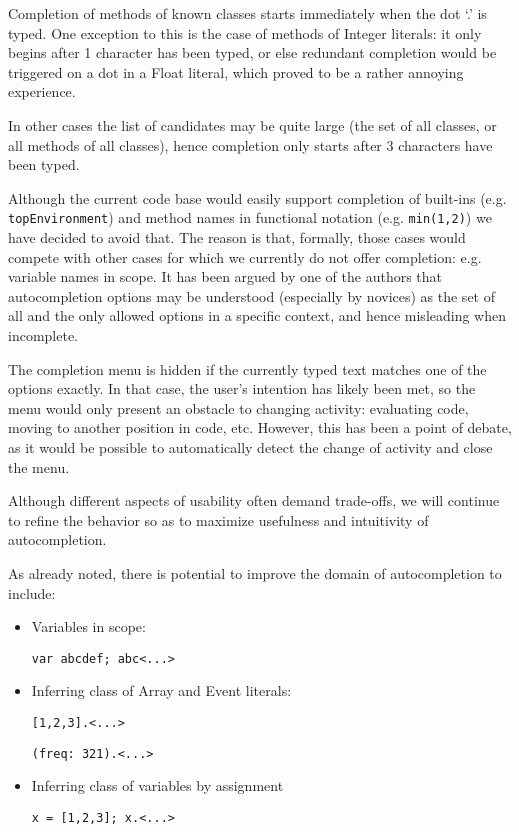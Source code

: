 \documentclass[11pt,a4paper]{article}
\begin{document}
Completion of methods of known classes starts immediately when the dot `.' is typed. One exception
to this is the case of methods of Integer literals: it only begins after 1 character has been
typed, or else redundant completion would be triggered on a dot in a Float literal, which proved
to be a rather annoying experience.

In other cases the list of candidates may be quite large (the set of all classes, or all methods of
all classes), hence completion only starts after 3 characters have been typed.

Although the current code base would easily support completion of built-ins (e.g.
\verb|topEnvironment|) and method names in functional notation (e.g. \verb|min(1,2)|) we have
decided to avoid that. The reason is that, formally, those cases would compete with other cases for
which we currently do not offer completion: e.g. variable names in scope. It has been argued by
one of the authors that autocompletion options may be understood (especially by novices) as the set
of all and the only allowed options in a specific context, and hence misleading when incomplete.

The completion menu is hidden if the currently typed text matches one of the options exactly. In
that case, the user's intention has likely been met, so the menu would only present an obstacle to
changing activity: evaluating code, moving to another position in code, etc. However, this has been
a point of debate, as it would be possible to automatically detect the change of activity and close
the menu.

Although different aspects of usability often demand trade-offs, we will continue to refine the
behavior so as to maximize usefulness and intuitivity of autocompletion.

As already noted, there is potential to improve the domain of autocompletion to include:
\begin{itemize}
 \item Variables in scope:

 \verb|var abcdef; abc<...>|

 \item Inferring class of Array and Event literals:

 \verb|[1,2,3].<...>|

 \verb|(freq: 321).<...>|

 \item Inferring class of variables by assignment

 \verb|x = [1,2,3]; x.<...>|

\end{itemize}
\end{document}
